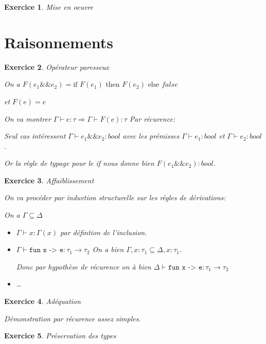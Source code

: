 \documentclass{article}
\theoremstyle{plain}
\newtheorem{exo}{Exercice}%
\begin{document}
\begin{exo}Mise en oeuvre
    
\end{exo}

\section{Raisonnements}
\begin{exo}Opérateur paresseux
  
  On a $F(e_1 \&\& e_2) = \text{if } F(e_1) \text{ then }
                                F(e_2) \text{ else } false$

    et $F(e) = e$

  On va montrer $\Gamma \vdash e : \tau \Rightarrow \Gamma \vdash F(e) : \tau$
  Par récurence:

  Seul cas intéressent $\Gamma \vdash e_1 \&\& e_2 : bool$ avec les prémisses
  $\Gamma \vdash e_1:bool$ et $\Gamma \vdash e_2 : bool$.
  
  Or la règle de typage pour le if nous donne bien $F(e_1 \&\& e_2) : bool$.
\end{exo}

\begin{exo}Affaiblissement
  
  On va procéder par induvtion structurelle sur les règles de dérivations:

  On a $\Gamma \subseteq \Delta$

\begin{itemize}
  \item $\Gamma \vdash x : \Gamma(x)$ par défintion de l'inclusion.

  \item $\Gamma \vdash \texttt{fun x -> e} : \tau_1 \to \tau_2$ On a bien
    $\Gamma, x: \tau_1 \subseteq \Delta, x : \tau_1$. 

    Donc par hypothèse de récurence on à bien $\Delta \vdash
            \texttt{fun x -> e} : \tau_1 \to \tau_2 $

  \item \ldots
\end{itemize}
\end{exo}

\begin{exo}Adéquation
  
  Démonstration par récurence assez simples.
    
\end{exo}

\begin{exo}Préservation des types
    
\end{exo}
\end{document}
